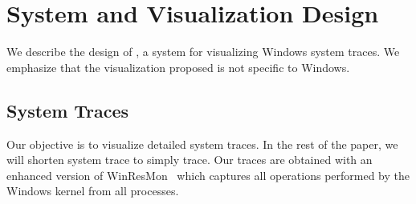 \section{System and Visualization Design}


We describe the design of \lviz{}, a system for visualizing Windows system
traces.
We emphasize that the visualization proposed
is not specific to Windows.

\subsection{System Traces}
\label{sec:systrace}

Our objective is to visualize detailed system traces.
In the rest of the paper, we will shorten system trace to simply trace.
Our traces are obtained with an enhanced version of
WinResMon~\cite{winresmon} which
captures all operations performed by the Windows kernel
from all processes.

